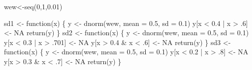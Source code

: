 \documentclass[
  letterpaper,
  DIV=11,
  numbers=noendperiod]{scrartcl}
\newenvironment{Shaded}{\begin{snugshade}}{\end{snugshade}}
\newcommand{\AttributeTok}[1]{\textcolor[rgb]{0.40,0.45,0.13}{#1}}
\newcommand{\ConstantTok}[1]{\textcolor[rgb]{0.56,0.35,0.01}{#1}}
\newcommand{\ControlFlowTok}[1]{\textcolor[rgb]{0.00,0.23,0.31}{#1}}
\newcommand{\DecValTok}[1]{\textcolor[rgb]{0.68,0.00,0.00}{#1}}
\newcommand{\FloatTok}[1]{\textcolor[rgb]{0.68,0.00,0.00}{#1}}
\newcommand{\FunctionTok}[1]{\textcolor[rgb]{0.28,0.35,0.67}{#1}}
\newcommand{\NormalTok}[1]{\textcolor[rgb]{0.00,0.23,0.31}{#1}}
\newcommand{\OtherTok}[1]{\textcolor[rgb]{0.00,0.23,0.31}{#1}}
\newcommand{\SpecialCharTok}[1]{\textcolor[rgb]{0.37,0.37,0.37}{#1}}
\begin{document}
\begin{Shaded}
\begin{Highlighting}[]
\NormalTok{wew}\OtherTok{\textless{}{-}}\FunctionTok{seq}\NormalTok{(}\DecValTok{0}\NormalTok{,}\DecValTok{1}\NormalTok{,}\FloatTok{0.01}\NormalTok{)}

\NormalTok{sd1 }\OtherTok{\textless{}{-}} \ControlFlowTok{function}\NormalTok{(x) \{}
\NormalTok{    y }\OtherTok{\textless{}{-}} \FunctionTok{dnorm}\NormalTok{(wew, }\AttributeTok{mean =} \FloatTok{0.5}\NormalTok{, }\AttributeTok{sd =} \FloatTok{0.1}\NormalTok{)}
\NormalTok{    y[x }\SpecialCharTok{\textless{}} \FloatTok{0.4} \SpecialCharTok{|}\NormalTok{ x }\SpecialCharTok{\textgreater{}}\NormalTok{ .}\DecValTok{6}\NormalTok{] }\OtherTok{\textless{}{-}} \ConstantTok{NA}
    \FunctionTok{return}\NormalTok{(y)}
\NormalTok{\}}
\NormalTok{sd2 }\OtherTok{\textless{}{-}} \ControlFlowTok{function}\NormalTok{(x) \{}
\NormalTok{    y }\OtherTok{\textless{}{-}} \FunctionTok{dnorm}\NormalTok{(wew, }\AttributeTok{mean =} \FloatTok{0.5}\NormalTok{, }\AttributeTok{sd =} \FloatTok{0.1}\NormalTok{)}
\NormalTok{    y[x }\SpecialCharTok{\textless{}} \FloatTok{0.3} \SpecialCharTok{|}\NormalTok{ x }\SpecialCharTok{\textgreater{}}\NormalTok{ .}\DecValTok{701}\NormalTok{] }\OtherTok{\textless{}{-}} \ConstantTok{NA}
\NormalTok{    y[x }\SpecialCharTok{\textgreater{}} \FloatTok{0.4} \SpecialCharTok{\&}\NormalTok{ x }\SpecialCharTok{\textless{}}\NormalTok{ .}\DecValTok{6}\NormalTok{] }\OtherTok{\textless{}{-}} \ConstantTok{NA}
    \FunctionTok{return}\NormalTok{(y)}
\NormalTok{\}}
\NormalTok{sd3 }\OtherTok{\textless{}{-}} \ControlFlowTok{function}\NormalTok{(x) \{}
\NormalTok{    y }\OtherTok{\textless{}{-}} \FunctionTok{dnorm}\NormalTok{(wew, }\AttributeTok{mean =} \FloatTok{0.5}\NormalTok{, }\AttributeTok{sd =} \FloatTok{0.1}\NormalTok{)}
\NormalTok{    y[x }\SpecialCharTok{\textless{}} \FloatTok{0.2} \SpecialCharTok{|}\NormalTok{ x }\SpecialCharTok{\textgreater{}}\NormalTok{ .}\DecValTok{8}\NormalTok{] }\OtherTok{\textless{}{-}} \ConstantTok{NA}
\NormalTok{    y[x }\SpecialCharTok{\textgreater{}} \FloatTok{0.3} \SpecialCharTok{\&}\NormalTok{ x }\SpecialCharTok{\textless{}}\NormalTok{ .}\DecValTok{7}\NormalTok{] }\OtherTok{\textless{}{-}} \ConstantTok{NA}
    \FunctionTok{return}\NormalTok{(y)}
\NormalTok{\}}


\end{Highlighting}
\end{Shaded}
\end{document}
